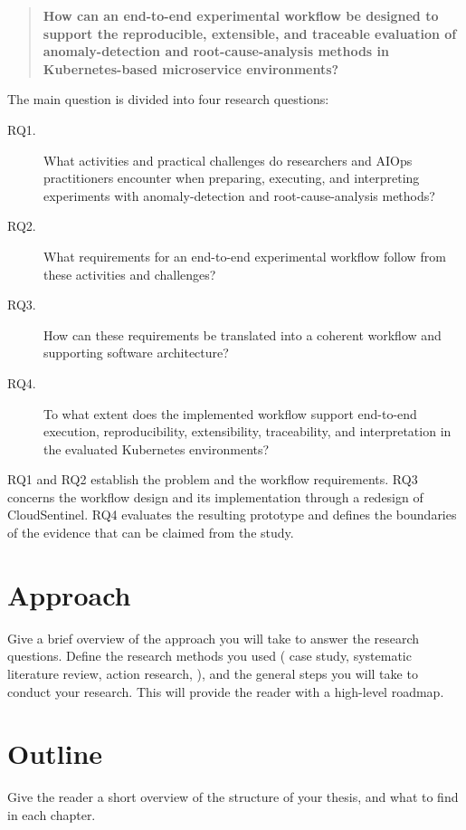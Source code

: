 \begin{quote}
\textbf{How can an end-to-end experimental workflow be designed to support the reproducible, extensible, and traceable evaluation of anomaly-detection and root-cause-analysis methods in Kubernetes-based microservice environments?}
\end{quote}

The main question is divided into four research questions:

\begin{description}
    \item[RQ1.] What activities and practical challenges do researchers and AIOps practitioners encounter when preparing, executing, and interpreting experiments with anomaly-detection and root-cause-analysis methods?
    \item[RQ2.] What requirements for an end-to-end experimental workflow follow from these activities and challenges?
    \item[RQ3.] How can these requirements be translated into a coherent workflow and supporting software architecture?
    \item[RQ4.] To what extent does the implemented workflow support end-to-end execution, reproducibility, extensibility, traceability, and interpretation in the evaluated Kubernetes environments?
\end{description}

RQ1 and RQ2 establish the problem and the workflow requirements. RQ3 concerns the workflow design and its implementation through a redesign of CloudSentinel. RQ4 evaluates the resulting prototype and defines the boundaries of the evidence that can be claimed from the study.

\section{Approach}
Give a brief overview of the approach you will take to answer the research questions.
Define the research methods you used (\eg{} case study, systematic literature review, action research, \etc{}), and the general steps you will take to conduct your research.
This will provide the reader with a high-level roadmap.


\section{Outline}
Give the reader a short overview of the structure of your thesis, and what to find in each chapter.
